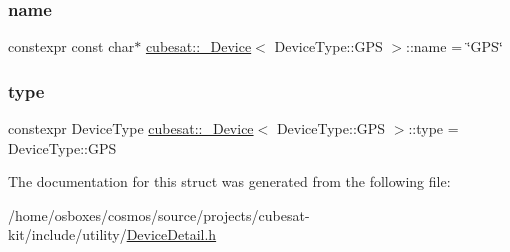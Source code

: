 \subsubsection{\texorpdfstring{name}{name}}
{\footnotesize\ttfamily constexpr const char$\ast$ \hyperlink{structcubesat_1_1__Device}{cubesat\+::\+\_\+\+Device}$<$ Device\+Type\+::\+G\+PS $>$\+::name = \char`\"{}G\+PS\char`\"{}\hspace{0.3cm}{\ttfamily [static]}}

\mbox{\label{structcubesat_1_1__Device_3_01DeviceType_1_1GPS_01_4_ad312ade134d76a5081890c386cbcbba2}} 
\subsubsection{\texorpdfstring{type}{type}}
{\footnotesize\ttfamily constexpr Device\+Type \hyperlink{structcubesat_1_1__Device}{cubesat\+::\+\_\+\+Device}$<$ Device\+Type\+::\+G\+PS $>$\+::type = Device\+Type\+::\+G\+PS\hspace{0.3cm}{\ttfamily [static]}}



The documentation for this struct was generated from the following file\+:\begin{DoxyCompactItemize}
\item 
/home/osboxes/cosmos/source/projects/cubesat-\/kit/include/utility/\hyperlink{DeviceDetail_8h}{Device\+Detail.\+h}\end{DoxyCompactItemize}
